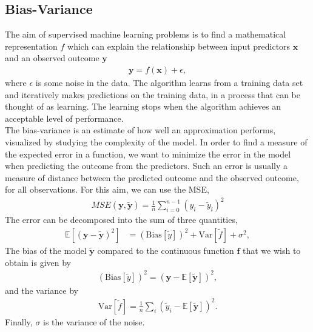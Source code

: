\documentclass[reprint,english,notitlepage]{revtex4-1}  %
\begin{document}
\subsection*{Bias-Variance}
The aim of supervised machine learning problems is to find a mathematical representation $f$ which can explain the relationship between input predictors $\boldsymbol{x}$ and an observed outcome $\boldsymbol{y}$
\begin{align}
    \boldsymbol{y} = f(\boldsymbol{x}) + \epsilon, 
\end{align}
where $\epsilon$ is some noise in the data. The algorithm learns from a training data set and iteratively makes predictions on the training data, in a process that can be thought of as learning. The learning stops when the algorithm achieves an acceptable level of performance. 
\vspace{3mm}
\\
The bias-variance is an estimate of how well an approximation performs, visualized by studying the complexity of the model. In order to find a measure of the expected error in a function, we want to minimize the error in the model when predicting the outcome from the predictors. Such an error is usually a measure of distance between the predicted outcome and the observed outcome, for all observations. For this aim, we can use the MSE, 
\begin{align}\label{eq: MSE}
    MSE\left(\boldsymbol{y},\boldsymbol{\tilde{y}}\right) = \frac{1}{n}\sum\limits_{i=0}^{n-1}{\left(y_i - \tilde{y}_i\right)}^2
\end{align}
The error can be decomposed into the sum of three quantities, 
\begin{align}
    \mathbb{E}[(\boldsymbol{y} - \boldsymbol{\tilde{y}})^2] 
    &= (\text{Bias}[\tilde{y}])^2 
        + \text{Var}[\tilde{f}] 
        + \sigma^2, 
\end{align}
The bias of the model $\boldsymbol{\tilde{y}}$ compared to the continuous function $\boldsymbol{f}$ that we wish to obtain is given by 
\begin{align}
    (\text{Bias}[\tilde{y}])^2 = (\boldsymbol{y} - \mathbb{E}[\boldsymbol{\tilde{y}}])^2, 
\end{align}
and the variance by 
\begin{align}
    \text{Var}[\tilde{f}] = \frac{1}{n}\sum\limits_i (\tilde{y}_i - \mathbb{E}[\boldsymbol{\tilde{y}}])^2. 
\end{align}
Finally, $\sigma$ is the variance of the noise. 
\vspace{3mm}
\end{document}
